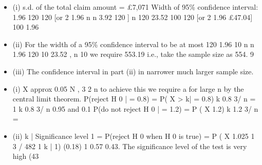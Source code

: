 \documentclass[a4paper,12pt]{article}
\begin{document}
\begin{itemize}
\item (i)
s.d. of the total claim amount = £7,071
Width of 95\% confidence interval: 1.96
120
120
[or 2 1.96
n
n
3.92
120
]
n
120
23.52
100
120
[or 2 1.96
£47.04]
100
1.96
\item (ii)
For the width of a 95\% confidence interval to be at most
120
1.96
10
n
n
1.96 120
10
23.52 , n
10 we require
553.19
i.e., take the sample size as 554.
9
\item (iii) The confidence interval in  part (ii) in narrower
much larger sample size.
\item (i) X approx
0.05
N
,
3 2
n
to achieve this we require a
for large n by the central limit theorem.
P(reject H 0 | = 0.8) = P( X > k| = 0.8)
k 0.8
3/ n
= 1
k 0.8
3/ n
0.95
and
0.1
P(do not reject H 0 | = 1.2)
= P ( X
1.2)
k 1.2
3/ n
=
\item (ii)
k |
Significance level
1
= P(reject H 0 when H 0 is true) = P ( X
1.025 1
3 / 482
1
k |
1)
(0.18) 1 0.57 0.43.
The significance level of the test is very high (43%
\end{itemize}
\end{document}
